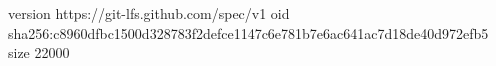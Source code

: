 version https://git-lfs.github.com/spec/v1
oid sha256:c8960dfbc1500d328783f2defce1147c6e781b7e6ac641ac7d18de40d972efb5
size 22000
